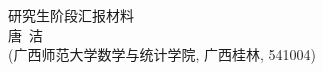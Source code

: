 \documentclass[UFT8]{ctexart}%
\begin{document}
\thispagestyle{empty} %
\vspace*{3cm}
\begin{center}
{{\LARGE\heiti 研究生阶段汇报材料}\\[0.6cm]
{\normalsize 唐\ 洁}\\[0.1cm]
{\small(广西师范大学数学与统计学院, 广西桂林, 541004)}}
\end{center}

\clearpage%
\thispagestyle{empty} %

\clearpage%
\setcounter{page}{1}%





\end{document}
